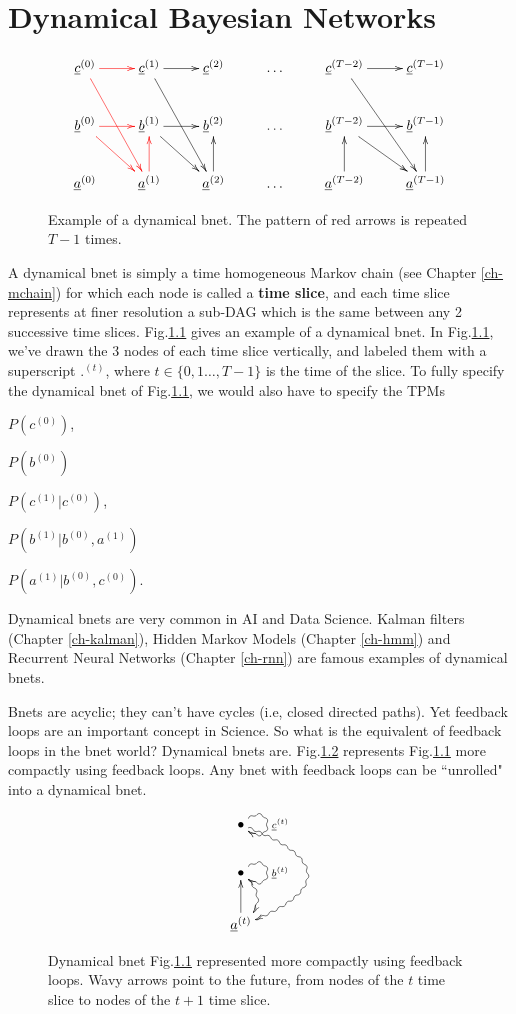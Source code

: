 \chapter{Dynamical Bayesian Networks}
\label{ch-dyn-bnet}

\begin{figure}[h!]
$$
\xymatrix{
\rvc^{(0)}\ar@[red][r]\ar@[red][rdd]
&\rvc^{(1)}\ar[r]\ar[rdd]
&\rvc^{(2)}
&\ldots
&\rvc^{(T-2)}\ar[r]\ar[rdd]
&\rvc^{(T-1)}
\\
\rvb^{(0)}\ar@[red][rd]\ar@[red][r]
&\rvb^{(1)}\ar[rd]\ar[r]
&\rvb^{(2)}
&\ldots
&\rvb^{(T-2)}\ar[rd]\ar[r]
&\rvb^{(T-1)}
\\
\rva^{(0)}
&\rva^{(1)}\ar@[red][u]
&\rva^{(2)}\ar[u]
&\ldots
&\rva^{(T-2)}\ar[u]
&\rva^{(T-1)}\ar[u]
}$$
\caption{
Example of a dynamical bnet. The
pattern of red arrows is repeated $T-1$ times.
}
\label{fig-dyn-bnet}
\end{figure}



A dynamical bnet is simply
a time homogeneous Markov chain (see Chapter
\ref{ch-mchain})
for which each node is 
called a {\bf time slice},
and each time slice 
represents
at finer resolution a sub-DAG
which is the same 
between any
2 successive time slices.
Fig.\ref{fig-dyn-bnet} gives an example
of a dynamical bnet.
In Fig.\ref{fig-dyn-bnet},
we've drawn the 3 nodes of
each time slice vertically,
and labeled them
with a superscript ${.}^{(t)}$,
where $t\in \{
0,1 \ldots, T-1\}$ 
is the time
of the slice.
To fully 
specify the
dynamical bnet
of Fig.\ref{fig-dyn-bnet},
we would also have to specify
the TPMs 

$P(c^{(0)})$, 

$P(b^{(0)})$

$P(c^{(1)}|c^{(0)})$,
 
$P(b^{(1)}|b^{(0)}, a^{(1)})$

$P(a^{(1)}|b^{(0)}, c^{(0)})$.

Dynamical bnets
are very common
in AI and Data Science.
Kalman filters (Chapter \ref{ch-kalman}),
Hidden Markov Models (Chapter \ref{ch-hmm})
and
Recurrent Neural Networks 
(Chapter \ref{ch-rnn})
are famous examples of dynamical bnets.

Bnets are acyclic; they can't have cycles
(i.e, closed directed paths).
Yet feedback loops are an important
concept in Science. So what is
the equivalent of feedback loops in the
bnet world? Dynamical bnets are.
Fig.\ref{fig-dyn-bnet-compact}
represents
Fig.\ref{fig-dyn-bnet} more 
compactly using feedback loops. 
Any bnet with feedback loops
can be ``unrolled" into a dynamical bnet.


\begin{figure}[h!]
$$
\xymatrix{
\bullet
\ar@/^4pc/@{~>}[dd]
\ar@(ur,dr)@{~>}[]^{\rvc^{(t)}}
\\
\bullet
\ar@/^1pc/@{~>}[d]
\ar@(ur,dr)@{~>}[]^{\rvb^{(t)}}
\\
\rva^{(t)}\ar[u]
}$$
\caption{
Dynamical bnet Fig.\ref{fig-dyn-bnet}
represented 
more compactly using feedback loops.
Wavy arrows
point to the future, from nodes of the $t$ time slice
to nodes of the $t+1$ time slice.
}
\label{fig-dyn-bnet-compact}
\end{figure}
